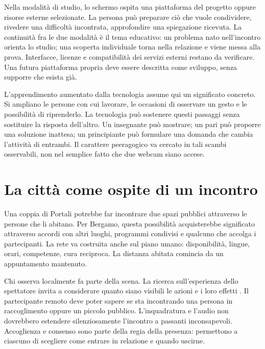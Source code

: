 Nella modalità di studio, lo schermo ospita una piattaforma del progetto oppure risorse esterne selezionate. La persona può preparare ciò che vuole condividere, rivedere una difficoltà incontrata, approfondire una spiegazione ricevuta. La continuità fra le due modalità è il tema educativo: un problema nato nell'incontro orienta lo studio; una scoperta individuale torna nella relazione e viene messa alla prova. Interfacce, licenze e compatibilità dei servizi esterni restano da verificare. Una futura piattaforma propria deve essere descritta come sviluppo, senza supporre che esista già.

L'apprendimento aumentato dalla tecnologia assume qui un significato concreto. Si ampliano le persone con cui lavorare, le occasioni di osservare un gesto e le possibilità di riprenderlo. La tecnologia può sostenere questi passaggi senza sostituire la risposta dell'altro. Un insegnante può mostrare; un pari può proporre una soluzione inattesa; un principiante può formulare una domanda che cambia l'attività di entrambi. Il carattere peeragogico va cercato in tali scambi osservabili, non nel semplice fatto che due webcam siano accese.

\section{La città come ospite di un incontro}

Una coppia di Portali potrebbe far incontrare due spazi pubblici attraverso le persone che li abitano. Per Bergamo, questa possibilità acquisterebbe significato attraverso accordi con altri luoghi, programmi condivisi e qualcuno che accolga i partecipanti. La rete va costruita anche sul piano umano: disponibilità, lingue, orari, competenze, cura reciproca. La distanza abitata comincia da un appuntamento mantenuto.

Chi osserva localmente fa parte della scena. La ricerca sull'esperienza dello spettatore invita a considerare quanto siano visibili le azioni e i loro effetti \cite{conc_reeves2005}. Il partecipante remoto deve poter sapere se sta incontrando una persona in raccoglimento oppure un piccolo pubblico. L'inquadratura e l'audio non dovrebbero estendere silenziosamente l'incontro a passanti inconsapevoli. Accoglienza e consenso sono parte della regia della presenza: permettono a ciascuno di scegliere come entrare in relazione e quando uscirne.

